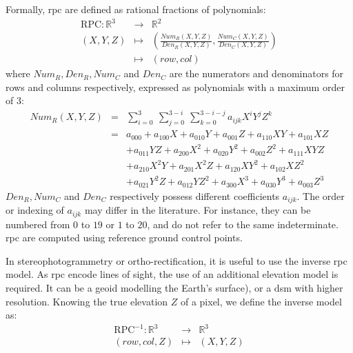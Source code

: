 Formally, \acrshort{rpc} are defined as rational fractions of polynomials:  
\begin{eqnarray*}
    \mathrm{RPC}:\mathbb{R}^3 &\rightarrow&\mathbb{R}^2\\
    (X,Y,Z) 	&\mapsto& \left(\frac{Num_{R}(X,Y,Z)}{Den_{R}(X,Y,Z)}, \frac{Num_{C}(X,Y,Z)}{Den_{C}(X,Y,Z)}\right)\\
    &\mapsto&(row,col)
\end{eqnarray*}
where $Num_{R},Den_{R},Num_{C}$ and $Den_{C}$ are the numerators and denominators for rows and columns respectively, expressed as polynomials with a maximum order of $3$:
\begin{eqnarray*}
    Num_R(X,Y,Z) &=& \sum_{i=0}^3~\sum_{j=0}^{3-i}~\sum_{k=0}^{3-i-j}a_{ijk}X^iY^jZ^k\\
    &=& a_{000} + a_{100} X + a_{010} Y + a_{001} Z + a_{110} XY + a_{101} XZ \\
    &&+ a_{011} YZ + a_{200} X^2 + a_{020} Y^2 + a_{002} Z^2 + a_{111} XYZ \\
    && + a_{210} X^2Y + a_{201} X^2Z + a_{120} XY^2 + a_{102} XZ^2\\
    && + a_{021} Y^2Z + a_{012} YZ^2 + a_{300} X^3 + a_{030} Y^3 + a_{003} Z^3
\end{eqnarray*}
$Den_{R},Num_{C}$ and $Den_{C}$ respectively possess different coefficients $a_{ijk}$. The order or indexing of $a_{ijk}$ may differ in the literature. For instance, they can be numbered from $0$ to $19$ or $1$ to $20$, and do not refer to the same indeterminate. \acrshort{rpc} are computed using reference ground control points.

In stereophotogrammetry or ortho-rectification, it is useful to use the inverse \acrshort{rpc} model. As \acrshort{rpc} encode lines of sight, the use of an additional elevation model is required. It can be a geoid modelling the Earth's surface), or a \acrshort{dsm} with higher resolution. Knowing the true elevation $Z$ of a pixel, we define the inverse model as:
\begin{eqnarray*}
    \mathrm{RPC}^{-1}:\mathbb{R}^3 &\rightarrow&\mathbb{R}^3\\
    (row, col, Z) 	&\mapsto& (X,Y,Z)
\end{eqnarray*}


